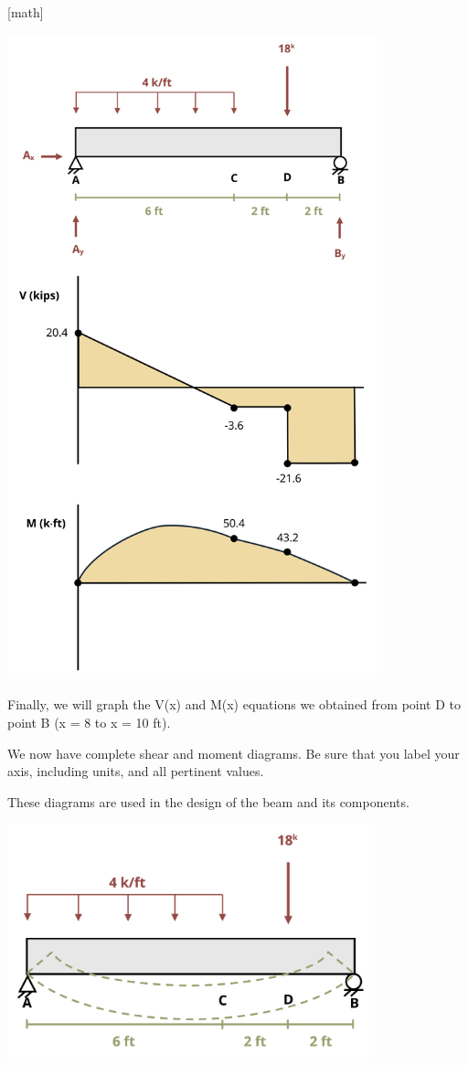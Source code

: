 \documentclass[
  letterpaper,
  DIV=11,
  numbers=noendperiod]{scrreprt}
\begin{document}
\begin{tcolorbox}
{[}math{]}

\begin{center}
\includegraphics[width=4.21875in,height=\textheight]{images/CH7 PNGs/example 7.2 part 9.png}
\end{center}

Finally, we will graph the V(x) and M(x) equations we obtained from
point D to point B (x = 8 to x = 10 ft).

We now have complete shear and moment diagrams. Be sure that you label
your axis, including units, and all pertinent values.

These diagrams are used in the design of the beam and its components.

\begin{center}
\includegraphics[width=4.1875in,height=\textheight]{images/CH7 PNGs/example 7.2 part 10.png}
\end{center}


\end{tcolorbox}
\end{document}
